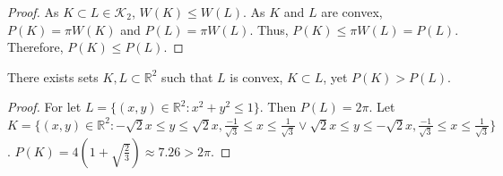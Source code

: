 \documentclass[crop=false,class=book,oneside]{standalone}
\begin{document}
            \begin{proof}
            As $K\subset L\in  \mathscr{K}_2$, $W(K)\leq W(L)$. As $K$ and $L$ are convex, $P(K)=\pi W(K)$ and $P(L)=\pi W(L)$. Thus, $P(K) \leq \pi W(L) = P(L)$. Therefore, $P(K)\leq P(L)$.
            \end{proof}
            \begin{theorem}
            There exists sets $K,L\subset \mathbb{R}^2$ such that $L$ is convex, $K\subset L$, yet $P(K)>P(L)$.
            \end{theorem}
            \begin{proof}
            For let $L = \{(x,y)\in \mathbb{R}^2: x^2 + y^2 \leq 1\}$. Then $P(L) = 2\pi$. Let $K = \{(x,y)\in \mathbb{R}^2: -\sqrt{2}x\leq y \leq \sqrt{2}x,\frac{-1}{\sqrt{3}} \leq x \leq \frac{1}{\sqrt{3}} \lor \sqrt{2}x\leq y \leq -\sqrt{2}x,\frac{-1}{\sqrt{3}} \leq x \leq \frac{1}{\sqrt{3}} \}$. $P(K) = 4(1+ \sqrt{\frac{2}{3}}) \approx 7.26>2\pi$.
            \end{proof}
\end{document}
